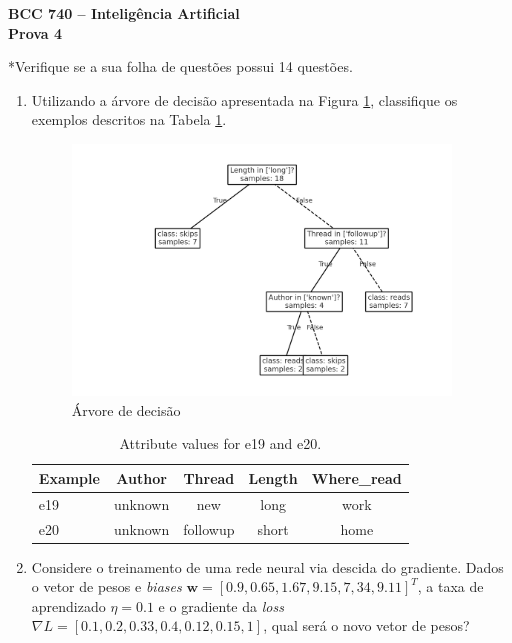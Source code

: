 \documentclass[12pt,a4paper]{article}
\begin{document}
\begin{center}
  {\Large \textbf{BCC 740 -- Inteligência Artificial}}\\[2pt]
  {\large \textbf{Prova 4}}\\[4pt]
\end{center}


*Verifique se a sua folha de questões possui 14 questões.

\begin{enumerate}[leftmargin=0.55cm,itemsep=0.65em]

  \item Utilizando a árvore de decisão apresentada na Figura \ref{fig:dt}, classifique os exemplos descritos na Tabela \ref{tab:e19e20}.


  \begin{figure}[!ht]
    \centering
    \includegraphics[width=0.95\textwidth]{dt.png}
    \caption{Árvore de decisão}
    \label{fig:dt}
  \end{figure}


  \begin{table}[h!]
    \centering
    \begin{tabular}{lcccc}
    \hline
    \textbf{Example} & \textbf{Author} & \textbf{Thread} & \textbf{Length} & \textbf{Where\_read} \\
    \hline
    e19 & unknown & new      & long  & work \\
    e20 & unknown & followup & short & home \\
    \hline
    \end{tabular}
    \caption{Attribute values for e19 and e20.}
    \label{tab:e19e20}
  \end{table}

  \item Considere o treinamento de uma rede neural via descida do gradiente. Dados o vetor de pesos e \textit{biases} $\mathbf{w} = [0.9,0.65,1.67,9.15,7,34,9.11]^T$, a taxa de aprendizado $\eta = 0.1$ e o gradiente da \textit{loss} $\nabla L = [0.1,0.2,0.33,0.4,0.12,0.15,1]$, qual será o novo vetor de pesos?
  

\end{enumerate}
\end{document}
